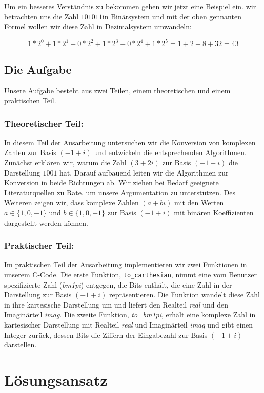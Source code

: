 \documentclass[course=erap]{aspdoc}
\begin{document}
    Um ein besseres Verständnis zu bekommen gehen wir jetzt eine Beispiel ein. wir betrachten uns die Zahl $101011$\space in Binärsystem und mit der oben gennanten Formel wollen wir diese Zahl in Dezimalsystem umwandeln:

    \[1* 2^0 + 1*2^1 + 0* 2^2 + 1* 2^3 + 0* 2^4 + 1* 2^5 = 1+2+8+32 = 43 \]
    \newpage
    \subsection{Die Aufgabe}

    Unsere Aufgabe besteht aus zwei Teilen, einem theoretischen und einem praktischen Teil.

    \subsubsection{Theoretischer Teil:}
    In diesem Teil der Ausarbeitung untersuchen wir die Konversion von komplexen Zahlen zur Basis $(-1 + i)$ und entwickeln die entsprechenden Algorithmen. Zunächst erklären wir, warum die Zahl $(3 + 2i)$ zur Basis $(-1 + i)$ die Darstellung $1001$ hat. Darauf aufbauend leiten wir die Algorithmen zur Konversion in beide Richtungen ab. Wir ziehen bei Bedarf geeignete Literaturquellen zu Rate, um unsere Argumentation zu unterstützen. Des Weiteren zeigen wir, dass komplexe Zahlen $(a + bi)$ mit den Werten $a \in \{1, 0, -1\}$ und $b \in \{1, 0, -1\}$ zur Basis $(-1 + i)$ mit binären Koeffizienten dargestellt werden können.

    \subsubsection{Praktischer Teil:}
    Im praktischen Teil der Ausarbeitung implementieren wir zwei Funktionen in unserem C-Code. Die erste Funktion, \texttt{to\_carthesian}, nimmt eine vom Benutzer spezifizierte Zahl (\textit{bm1pi}) entgegen, die Bits enthält, die eine Zahl in der Darstellung zur Basis $(-1 + i)$ repräsentieren. Die Funktion wandelt diese Zahl in ihre kartesische Darstellung um und liefert den Realteil \textit{real} und den Imaginärteil \textit{imag}. Die zweite Funktion, \textit{to\_bm1pi}, erhält eine komplexe Zahl in kartesischer Darstellung mit Realteil \textit{real} und Imaginärteil \textit{imag} und gibt einen Integer zurück, dessen Bits die Ziffern der Eingabezahl zur Basis $(-1 + i)$ darstellen.

    \section{Lösungsansatz}
\end{document}
